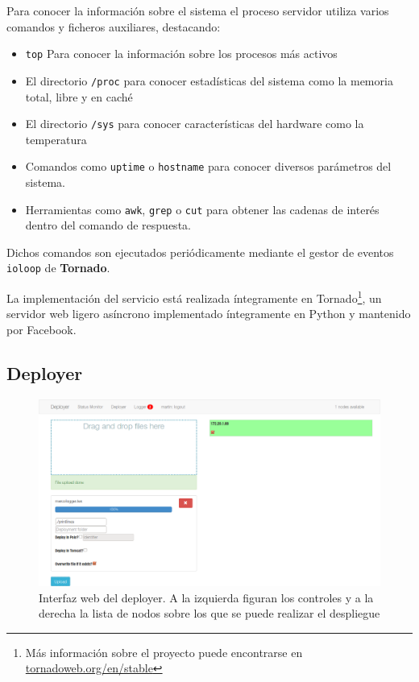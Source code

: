 Para conocer la información sobre el sistema el proceso servidor utiliza varios comandos y ficheros auxiliares, destacando:

\begin{itemize}
	\item \texttt{top} Para conocer la información sobre los procesos más activos
	\item El directorio \texttt{/proc} para conocer estadísticas del sistema como la memoria total, libre y en caché
	\item El directorio \texttt{/sys} para conocer características del hardware como la temperatura
	\item Comandos como \texttt{uptime} o \texttt{hostname} para conocer diversos parámetros del sistema.
	\item Herramientas como \texttt{awk}, \texttt{grep} o \texttt{cut} para obtener las cadenas de interés dentro del comando de respuesta.
\end{itemize}

Dichos comandos son ejecutados periódicamente mediante el gestor de eventos \texttt{ioloop} de \textbf{Tornado}.

La implementación del servicio está realizada íntegramente en Tornado\footnote{Más información sobre el proyecto puede encontrarse en \href{http://www.tornadoweb.org/en/stable/}{tornadoweb.org/en/stable}}, un servidor web ligero asíncrono implementado íntegramente en Python y mantenido por Facebook.

\subsection{Deployer}
\label{deployer}
\begin{figure}[H]
\centering
\includegraphics[height=0.3\textheight]{Chapters/Chapter5/Figures/screenshot-deployer}
\caption[Interfaz web del deployer]{Interfaz web del deployer. A la izquierda figuran los controles y a la derecha la lista de nodos sobre los que se puede realizar el despliegue}
\label{fig:vista_deployer}
\end{figure}

